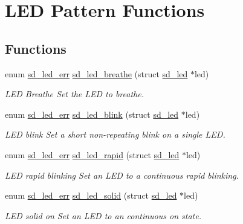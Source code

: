 \hypertarget{group___s_d___l_e_d___pattern___functions}{}\section{L\+ED Pattern Functions}
\label{group___s_d___l_e_d___pattern___functions}
\subsection*{Functions}
\begin{DoxyCompactItemize}
\item 
enum \mbox{\hyperlink{group___s_d___l_e_d___types_ga4f347a1003b4089de88a7f0fc62c1071}{sd\+\_\+led\+\_\+err}} \mbox{\hyperlink{group___s_d___l_e_d___pattern___functions_ga743f3686e524d035a3ed677d4de93869}{sd\+\_\+led\+\_\+breathe}} (struct \mbox{\hyperlink{structsd__led}{sd\+\_\+led}} $\ast$led)
\begin{DoxyCompactList}\small\item\em L\+ED Breathe Set the L\+ED to breathe. \end{DoxyCompactList}\item 
enum \mbox{\hyperlink{group___s_d___l_e_d___types_ga4f347a1003b4089de88a7f0fc62c1071}{sd\+\_\+led\+\_\+err}} \mbox{\hyperlink{group___s_d___l_e_d___pattern___functions_gad84b42b641e89723047588e46dcec709}{sd\+\_\+led\+\_\+blink}} (struct \mbox{\hyperlink{structsd__led}{sd\+\_\+led}} $\ast$led)
\begin{DoxyCompactList}\small\item\em L\+ED blink Set a short non-\/repeating blink on a single L\+ED. \end{DoxyCompactList}\item 
enum \mbox{\hyperlink{group___s_d___l_e_d___types_ga4f347a1003b4089de88a7f0fc62c1071}{sd\+\_\+led\+\_\+err}} \mbox{\hyperlink{group___s_d___l_e_d___pattern___functions_gaee88ed175473585caa9ae05d5b66f993}{sd\+\_\+led\+\_\+rapid}} (struct \mbox{\hyperlink{structsd__led}{sd\+\_\+led}} $\ast$led)
\begin{DoxyCompactList}\small\item\em L\+ED rapid blinking Set an L\+ED to a continuous rapid blinking. \end{DoxyCompactList}\item 
enum \mbox{\hyperlink{group___s_d___l_e_d___types_ga4f347a1003b4089de88a7f0fc62c1071}{sd\+\_\+led\+\_\+err}} \mbox{\hyperlink{group___s_d___l_e_d___pattern___functions_gac9aad35d0bb89acc8f47b9be781059c8}{sd\+\_\+led\+\_\+solid}} (struct \mbox{\hyperlink{structsd__led}{sd\+\_\+led}} $\ast$led)
\begin{DoxyCompactList}\small\item\em L\+ED solid on Set an L\+ED to an continuous on state. \end{DoxyCompactList}\end{DoxyCompactItemize}



